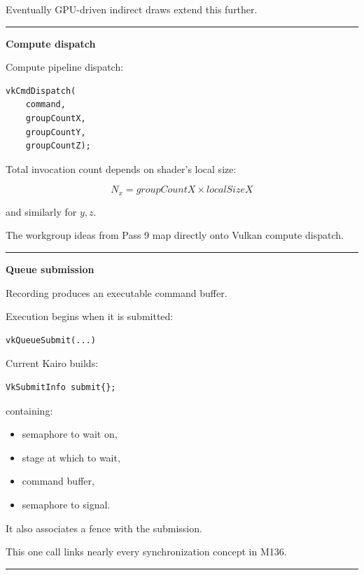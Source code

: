 Eventually GPU-driven indirect draws extend this further.

\begin{center}\rule{0.5\linewidth}{0.5pt}\end{center}

\textbf{Compute dispatch}

Compute pipeline dispatch:

\begin{verbatim}
vkCmdDispatch(
    command,
    groupCountX,
    groupCountY,
    groupCountZ);
\end{verbatim}

Total invocation count depends on shader's local size:

\[
N_x=
groupCountX\times localSizeX
\]

and similarly for \(y,z\).

The workgroup ideas from Pass 9 map directly onto Vulkan compute dispatch.

\begin{center}\rule{0.5\linewidth}{0.5pt}\end{center}

\textbf{Queue submission}

Recording produces an executable command buffer.

Execution begins when it is submitted:

\begin{verbatim}
vkQueueSubmit(...)
\end{verbatim}

Current Kairo builds:

\begin{verbatim}
VkSubmitInfo submit{};
\end{verbatim}

containing:

\begin{itemize}
\tightlist
\item
  semaphore to wait on,
\item
  stage at which to wait,
\item
  command buffer,
\item
  semaphore to signal.
\end{itemize}

It also associates a fence with the submission.

This one call links nearly every synchronization concept in M136.

\begin{center}\rule{0.5\linewidth}{0.5pt}\end{center}

